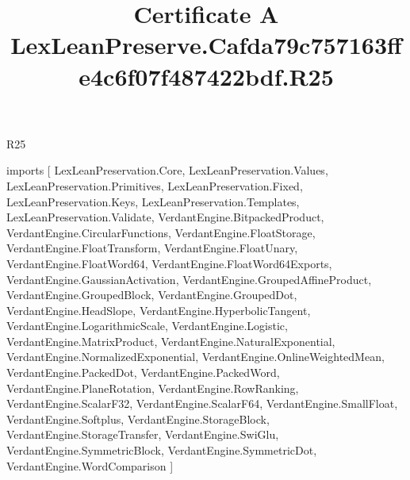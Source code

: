 \begin{lexlean}{R25}
\title{Certificate A LexLeanPreserve.Cafda79c757163ffe4c6f07f487422bdf.R25}
\begin{coremodule}
imports [
  LexLeanPreservation.Core,
  LexLeanPreservation.Values,
  LexLeanPreservation.Primitives,
  LexLeanPreservation.Fixed,
  LexLeanPreservation.Keys,
  LexLeanPreservation.Templates,
  LexLeanPreservation.Validate,
  VerdantEngine.BitpackedProduct,
  VerdantEngine.CircularFunctions,
  VerdantEngine.FloatStorage,
  VerdantEngine.FloatTransform,
  VerdantEngine.FloatUnary,
  VerdantEngine.FloatWord64,
  VerdantEngine.FloatWord64Exports,
  VerdantEngine.GaussianActivation,
  VerdantEngine.GroupedAffineProduct,
  VerdantEngine.GroupedBlock,
  VerdantEngine.GroupedDot,
  VerdantEngine.HeadSlope,
  VerdantEngine.HyperbolicTangent,
  VerdantEngine.LogarithmicScale,
  VerdantEngine.Logistic,
  VerdantEngine.MatrixProduct,
  VerdantEngine.NaturalExponential,
  VerdantEngine.NormalizedExponential,
  VerdantEngine.OnlineWeightedMean,
  VerdantEngine.PackedDot,
  VerdantEngine.PackedWord,
  VerdantEngine.PlaneRotation,
  VerdantEngine.RowRanking,
  VerdantEngine.ScalarF32,
  VerdantEngine.ScalarF64,
  VerdantEngine.SmallFloat,
  VerdantEngine.Softplus,
  VerdantEngine.StorageBlock,
  VerdantEngine.StorageTransfer,
  VerdantEngine.SwiGlu,
  VerdantEngine.SymmetricBlock,
  VerdantEngine.SymmetricDot,
  VerdantEngine.WordComparison
]


\end{coremodule}
\end{lexlean}
